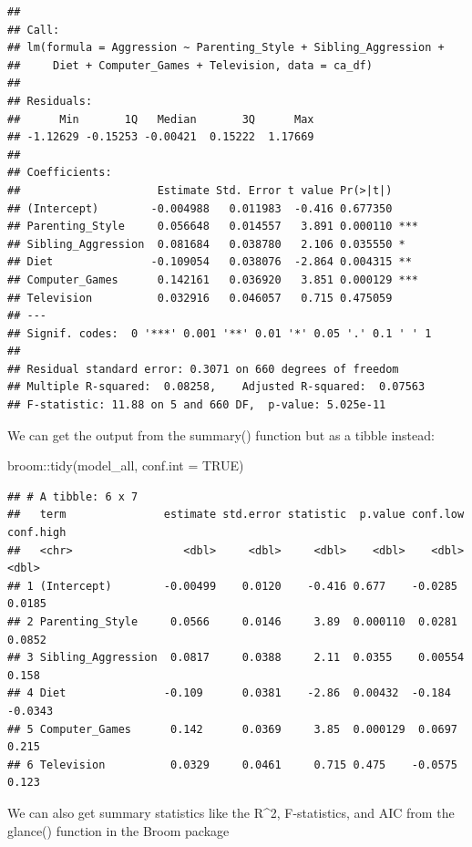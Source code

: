 \documentclass[
]{book}
\newenvironment{Shaded}{\begin{snugshade}}{\end{snugshade}}
\newcommand{\AttributeTok}[1]{\textcolor[rgb]{0.77,0.63,0.00}{#1}}
\newcommand{\ConstantTok}[1]{\textcolor[rgb]{0.00,0.00,0.00}{#1}}
\newcommand{\FunctionTok}[1]{\textcolor[rgb]{0.00,0.00,0.00}{#1}}
\newcommand{\NormalTok}[1]{#1}
\newcommand{\SpecialCharTok}[1]{\textcolor[rgb]{0.00,0.00,0.00}{#1}}
\begin{document}
\begin{verbatim}
## 
## Call:
## lm(formula = Aggression ~ Parenting_Style + Sibling_Aggression + 
##     Diet + Computer_Games + Television, data = ca_df)
## 
## Residuals:
##      Min       1Q   Median       3Q      Max 
## -1.12629 -0.15253 -0.00421  0.15222  1.17669 
## 
## Coefficients:
##                     Estimate Std. Error t value Pr(>|t|)    
## (Intercept)        -0.004988   0.011983  -0.416 0.677350    
## Parenting_Style     0.056648   0.014557   3.891 0.000110 ***
## Sibling_Aggression  0.081684   0.038780   2.106 0.035550 *  
## Diet               -0.109054   0.038076  -2.864 0.004315 ** 
## Computer_Games      0.142161   0.036920   3.851 0.000129 ***
## Television          0.032916   0.046057   0.715 0.475059    
## ---
## Signif. codes:  0 '***' 0.001 '**' 0.01 '*' 0.05 '.' 0.1 ' ' 1
## 
## Residual standard error: 0.3071 on 660 degrees of freedom
## Multiple R-squared:  0.08258,    Adjusted R-squared:  0.07563 
## F-statistic: 11.88 on 5 and 660 DF,  p-value: 5.025e-11
\end{verbatim}

We can get the output from the summary() function but as a tibble instead:

\begin{Shaded}
\begin{Highlighting}[]
\NormalTok{broom}\SpecialCharTok{::}\FunctionTok{tidy}\NormalTok{(model\_all, }\AttributeTok{conf.int =} \ConstantTok{TRUE}\NormalTok{)}
\end{Highlighting}
\end{Shaded}

\begin{verbatim}
## # A tibble: 6 x 7
##   term               estimate std.error statistic  p.value conf.low conf.high
##   <chr>                 <dbl>     <dbl>     <dbl>    <dbl>    <dbl>     <dbl>
## 1 (Intercept)        -0.00499    0.0120    -0.416 0.677    -0.0285     0.0185
## 2 Parenting_Style     0.0566     0.0146     3.89  0.000110  0.0281     0.0852
## 3 Sibling_Aggression  0.0817     0.0388     2.11  0.0355    0.00554    0.158 
## 4 Diet               -0.109      0.0381    -2.86  0.00432  -0.184     -0.0343
## 5 Computer_Games      0.142      0.0369     3.85  0.000129  0.0697     0.215 
## 6 Television          0.0329     0.0461     0.715 0.475    -0.0575     0.123
\end{verbatim}

We can also get summary statistics like the R\^{}2, F-statistics, and AIC from the glance() function in the Broom package
\end{document}
